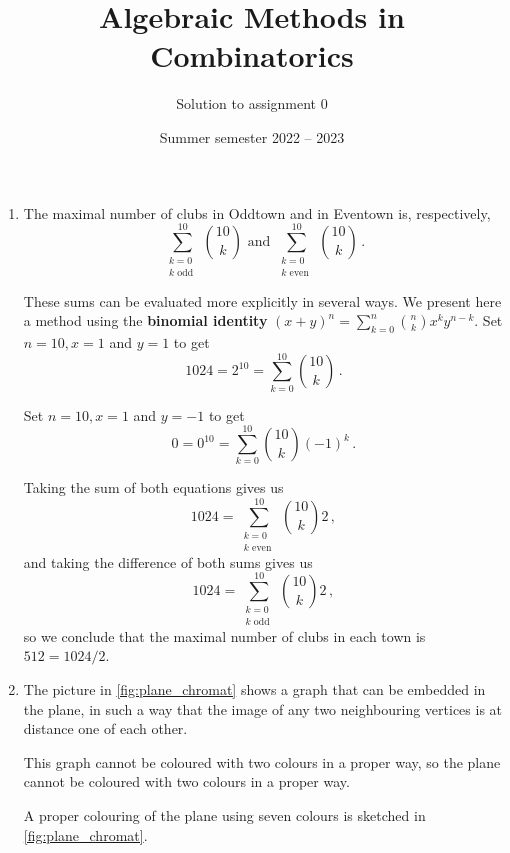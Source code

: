 \documentclass[kulak]{tplt}
\title{Algebraic Methods in Combinatorics}
\author{Solution to assignment 0}
\date{Summer semester 2022 -- 2023}
\theoremstyle{definition}
\begin{document}
\maketitle
\begin{enumerate}
\item 

The maximal number of clubs in Oddtown and in Eventown is, respectively, 
$$\sum_{\substack{k=0\\ k \text{ odd }}}^{10} \binom{10}{k} \text{ and }\sum_{\substack{k=0\\ k \text{ even }}}^{10} \binom{10}{k}\, . $$

These sums can be evaluated more explicitly in several ways.
We present here a method using the \textbf{binomial identity} $(x+y)^n = \sum_{k=0}^n \binom{n}{k} x^ky^{n-k}$.
Set $n = 10, x = 1$ and $y = 1$ to get
$$ 1024 = 2^{10} = \sum_{k = 0}^{10}\binom{10}{k}\, . $$

Set $n = 10, x = 1$ and $y = -1$ to get
$$ 0 = 0^{10} = \sum_{k = 0}^{10}\binom{10}{k}(-1)^k \, . $$

Taking the sum of both equations gives us
$$ 1024 = \sum_{\substack{k=0\\ k \text{ even }}}^{10} \binom{10}{k}2\, ,$$
and taking the difference of both sums gives us
$$ 1024 = \sum_{\substack{k=0\\ k \text{ odd }}}^{10} \binom{10}{k}2\, ,$$
so we conclude that the maximal number of clubs in each town is $512 = 1024 / 2$.


\item 
The picture in \cref{fig:plane_chromat} shows a graph that can be embedded in the plane, in such a way that the image of any two neighbouring vertices is at distance one of each other.

This graph cannot be coloured with two colours in a proper way, so the plane cannot be coloured with two colours in a proper way.

A proper colouring of the plane using seven colours is sketched in \cref{fig:plane_chromat}.



\end{enumerate}
\end{document}
